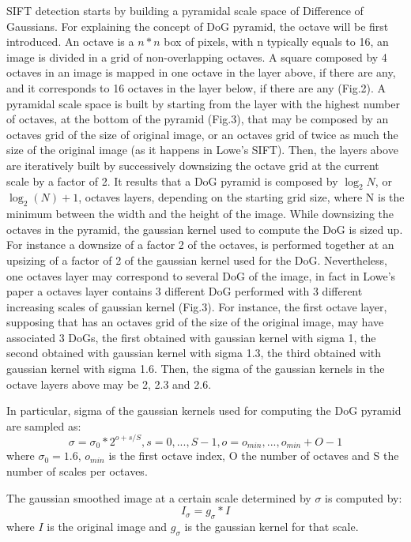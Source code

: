 \documentclass[aps,letterpaper,10pt]{revtex4}
\begin{document}
SIFT detection starts by building a pyramidal scale space of Difference of Gaussians. For explaining the concept of DoG pyramid, the octave will be first introduced. An octave is a $n*n$ box of pixels, with n typically equals to 16, an image is divided in a grid of non-overlapping octaves. A square composed by 4 octaves in an image is mapped in one octave in the layer above, if there are any, and it corresponds to 16 octaves in the layer below, if there are any (Fig.2). A pyramidal scale space is built by starting from the layer with the highest number of octaves, at the bottom of the pyramid (Fig.3), that may be composed by an octaves grid of the size of original image, or an octaves grid of twice as much the size of the original image (as it happens in Lowe's SIFT). Then, the layers above are iteratively built by successively downsizing the octave grid at the current scale by a factor of 2. It results that a DoG pyramid is composed by $\log_2 N$, or $\log_2 (N) + 1$, octaves layers, depending on the starting grid size, where N is the minimum between the width and the height of the image. While downsizing the octaves in the pyramid, the gaussian kernel used to compute the DoG is sized up. For instance a downsize of a factor 2 of the octaves, is performed together at an upsizing of a factor of 2 of the gaussian kernel used for the DoG. Nevertheless, one octaves layer may correspond to several DoG of the image, in fact in Lowe's paper a octaves layer contains 3 different DoG performed with 3 different increasing scales of gaussian kernel (Fig.3). For instance, the first octave layer, supposing that has an octaves grid of the size of the original image, may have associated 3 DoGs, the first obtained with gaussian kernel with sigma 1, the second obtained with gaussian kernel with sigma 1.3, the third obtained with gaussian kernel with sigma 1.6. Then, the sigma of the gaussian kernels in the octave layers above may be 2, 2.3 and 2.6.
 
In particular, sigma of the gaussian kernels used for computing the DoG pyramid are sampled as:
\begin{equation}
\sigma = \sigma_0*2^{o+s/S},    s = 0,...,S-1,    o=o_{min}, ..., o_{min} + O -1
\end{equation} 
where $\sigma_0=1.6$, $o_{min}$ is the first octave index, O the number of octaves and S the number of scales per octaves.
  
The gaussian smoothed image at a certain scale determined by $\sigma$ is computed by:
\begin{equation}
I_{\sigma} = g_{\sigma} * I
\end{equation}  
where $I$ is the original image and $g_{\sigma}$ is the gaussian kernel for that scale.
\end{document}
